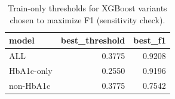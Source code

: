 \begin{table}[H]
\begin{center}
\begin{tabular}{lrr}
\toprule
model & best_threshold & best_f1 \\
\midrule
ALL & 0.3775 & 0.9208 \\
HbA1c-only & 0.2550 & 0.9196 \\
non-HbA1c & 0.3775 & 0.7542 \\
\bottomrule
\end{tabular}
\end{center}
\vspace{-5pt}
\caption{Train-only thresholds for XGBoost variants chosen to maximize F1 (sensitivity check).}
\label{tab:xgb_thresholds_f1_train}
\end{table}
